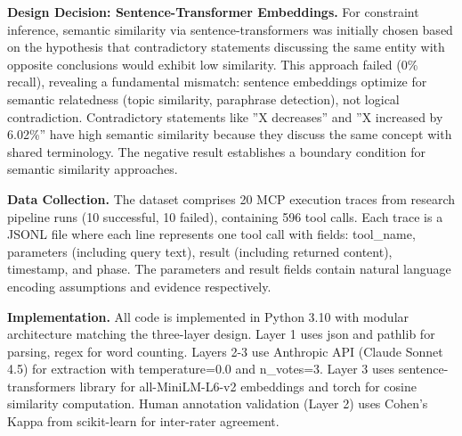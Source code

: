 \textbf{Design Decision: Sentence-Transformer Embeddings.} For constraint inference, semantic similarity via sentence-transformers was initially chosen based on the hypothesis that contradictory statements discussing the same entity with opposite conclusions would exhibit low similarity. This approach failed (0\% recall), revealing a fundamental mismatch: sentence embeddings optimize for semantic relatedness (topic similarity, paraphrase detection), not logical contradiction. Contradictory statements like ''X decreases'' and ''X increased by 6.02\%'' have high semantic similarity because they discuss the same concept with shared terminology. The negative result establishes a boundary condition for semantic similarity approaches.

\textbf{Data Collection.} The dataset comprises 20 MCP execution traces from research pipeline runs (10 successful, 10 failed), containing 596 tool calls. Each trace is a JSONL file where each line represents one tool call with fields: tool\_name, parameters (including query text), result (including returned content), timestamp, and phase. The parameters and result fields contain natural language encoding assumptions and evidence respectively.

\textbf{Implementation.} All code is implemented in Python 3.10 with modular architecture matching the three-layer design. Layer 1 uses json and pathlib for parsing, regex for word counting. Layers 2-3 use Anthropic API (Claude Sonnet 4.5) for extraction with temperature=0.0 and n\_votes=3. Layer 3 uses sentence-transformers library for all-MiniLM-L6-v2 embeddings and torch for cosine similarity computation. Human annotation validation (Layer 2) uses Cohen's Kappa from scikit-learn for inter-rater agreement.
